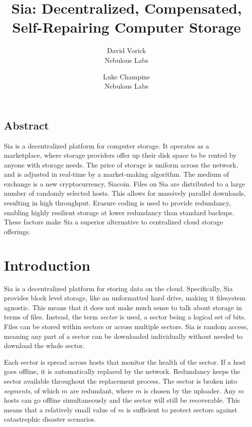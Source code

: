 \documentclass[twocolumn]{article}
\begin{document}
\frenchspacing

\title{Sia: Decentralized, Compensated, Self-Repairing Computer Storage}

\author{
{\rm David Vorick}\\
Nebulous Labs
\and
{\rm Luke Champine}\\
Nebulous Labs
}

\maketitle

\subsection*{Abstract}
Sia is a decentralized platform for computer storage.
It operates as a marketplace, where storage providers offer up their disk space to be rented by anyone with storage needs.
The price of storage is uniform across the network, and is adjusted in real-time by a market-making algorithm.
The medium of exchange is a new cryptocurrency, Siacoin.
Files on Sia are distributed to a large number of randomly selected hosts.
This allows for massively parallel downloads, resulting in high throughput.
Erasure coding is used to provide redundancy, enabling highly resilient storage at lower redundancy than standard backups.
These factors make Sia a superior alternative to centralized cloud storage offerings.

\section{Introduction}
Sia is a decentralized platform for storing data on the cloud.
Specifically, Sia provides block level storage, like an unformatted hard drive, making it filesystem agnostic.
This means that it does not make much sense to talk about storage in terms of files.
Instead, the term \textit{sector} is used, a sector being a logical set of bits.
Files can be stored within sectors or across multiple sectors.
Sia is random access, meaning any part of a sector can be downloaded individually without needed to download the whole sector.

Each sector is spread across \quorumsize{} hosts that monitor the health of the sector.
If a host goes offline, it is automatically replaced by the network.
Redundancy keeps the sector available throughout the replacement process.
The sector is broken into \quorumsize{} \textit{segments}, of which \(m\) are redundant, where \(m\) is chosen by the uploader.
Any \(m\) hosts can go offline simultaneously and the sector will still be recoverable.
This means that a relatively small value of \(m\) is sufficient to protect sectors against catastrophic disaster scenarios.
\end{document}

